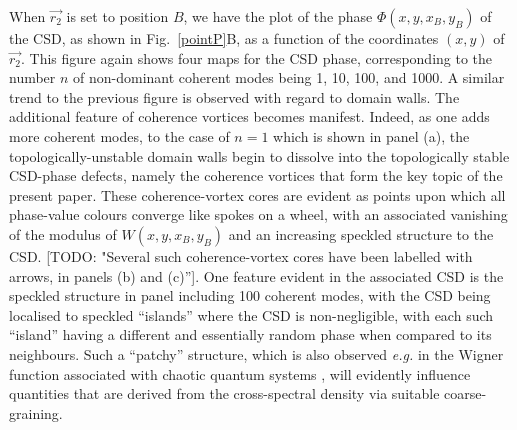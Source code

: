 \documentclass{iucr}              %
\newcommand{\todo}[1]{{\color{red}[TODO: "#1'']}}
\begin{document}
When $\vec{r_2}$ is set to position $B$, we have the plot of the phase $\Phi(x,y,x_B,y_B)$ of the CSD, as shown in Fig.~\ref{pointP}B, as a function of the coordinates $(x,y)$ of $\vec{r_2}$.  This figure again shows four maps for the CSD phase, corresponding to the number $n$ of non-dominant coherent modes being 1, 10, 100, and 1000.  A similar trend to the previous figure is observed with regard to domain walls.  The additional feature of coherence vortices becomes manifest.  Indeed, as one adds more coherent modes, to the case of $n=1$ which is shown in panel (a), the topologically-unstable domain walls begin to dissolve into the topologically stable CSD-phase defects, namely the coherence vortices that form the key topic of the present paper. These coherence-vortex cores are evident as points upon which all phase-value colours converge like spokes on a wheel, with an associated vanishing of the modulus of $W(x,y,x_B,y_B)$ and an increasing speckled structure to the CSD.  \todo{Several such coherence-vortex cores have been labelled with arrows, in panels (b) and (c)}.  One feature evident in the associated CSD is the speckled structure in panel including 100 coherent modes, with the CSD being localised to speckled ``islands'' where the CSD is non-negligible, with each such ``island'' having a different and essentially random phase when compared to its neighbours.  Such a ``patchy'' structure, which is also observed {\em e.g.} in the Wigner function associated with chaotic quantum systems \cite{Zurek}, will evidently influence quantities that are derived from the cross-spectral density via suitable coarse-graining.
\end{document}
